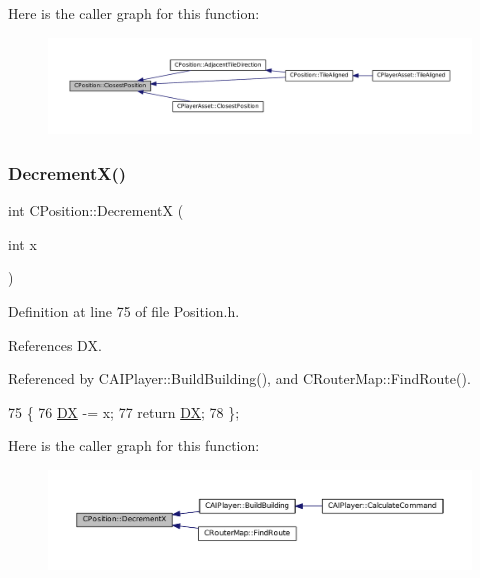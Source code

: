 Here is the caller graph for this function\+:\nopagebreak
\begin{figure}[H]
\begin{center}
\leavevmode
\includegraphics[width=350pt]{classCPosition_a91fd43eeb2c894bcb7577ae87247b726_icgraph}
\end{center}
\end{figure}
\hypertarget{classCPosition_a64f0d8ef8ca26c8b66b0997b3b132416}{}\label{classCPosition_a64f0d8ef8ca26c8b66b0997b3b132416} 
\subsubsection{\texorpdfstring{Decrement\+X()}{DecrementX()}}
{\footnotesize\ttfamily int C\+Position\+::\+DecrementX (\begin{DoxyParamCaption}\item[{int}]{x }\end{DoxyParamCaption})\hspace{0.3cm}{\ttfamily [inline]}}



Definition at line 75 of file Position.\+h.



References DX.



Referenced by C\+A\+I\+Player\+::\+Build\+Building(), and C\+Router\+Map\+::\+Find\+Route().


\begin{DoxyCode}
75                              \{
76             \hyperlink{classCPosition_a28445f9b872169715919074d82044eda}{DX} -= x; 
77             \textcolor{keywordflow}{return} \hyperlink{classCPosition_a28445f9b872169715919074d82044eda}{DX};
78         \};
\end{DoxyCode}
Here is the caller graph for this function\+:\nopagebreak
\begin{figure}[H]
\begin{center}
\leavevmode
\includegraphics[width=350pt]{classCPosition_a64f0d8ef8ca26c8b66b0997b3b132416_icgraph}
\end{center}
\end{figure}
\hypertarget{classCPosition_a51ee44d9e0457d6277567fd8a66fdec7}{}\label{classCPosition_a51ee44d9e0457d6277567fd8a66fdec7} 
